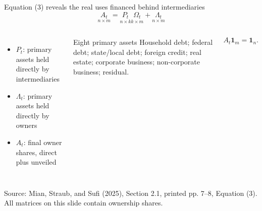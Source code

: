 \documentclass[aspectratio=169,11pt]{beamer}
\newcommand{\source}[1]{%
  \vfill
  {\color{MSSGray}\fontsize{6.5}{7.5}\selectfont #1\par}
}
\begin{document}
\begin{frame}{Equation (3) reveals the real uses financed behind intermediaries}
  \[
    \boxed{
      \underset{n\times m}{A_t}
      =
      \underset{n\times k}{P_t}
      \underset{k\times m}{\Omega_t}
      +
      \underset{n\times m}{\Lambda_t}
    }
    \tag{3}
  \]
  \begin{columns}[T,onlytextwidth]
    \begin{itemize}
      \item \(P_t\): primary assets held directly by intermediaries
      \item \(\Lambda_t\): primary assets held directly by owners
      \item \(A_t\): final owner shares, direct plus unveiled
    \end{itemize}

    \begin{block}{Eight primary assets}
      Household debt; federal debt; state/local debt; foreign credit; real
      estate; corporate business; non-corporate business; residual.
    \end{block}
    \[
      A_t\mathbf 1_m=\mathbf 1_n.
    \]
  \end{columns}
  \source{Source: Mian, Straub, and Sufi (2025), Section 2.1, printed pp. 7--8, Equation (3). All matrices on this slide contain ownership shares.}
\end{frame}
\end{document}
